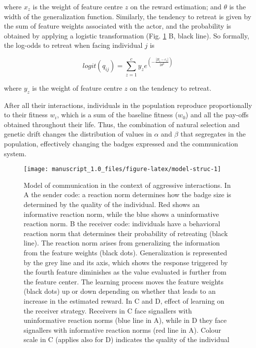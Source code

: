 \documentclass[
  12pt,
]{article}
\begin{document}
where \(x_z\) is the weight of feature centre \(z\) on the reward
estimation; and \(\theta\) is the width of the generalization function.
Similarly, the tendency to retreat is given by the sum of feature
weights associated with the actor, and the probability is obtained by
applying a logistic transformation (Fig. \ref{fig:model-struc} B, black
line). So formally, the log-odds to retreat when facing individual \(j\)
is

\begin{equation}
logit(q_{ij}) =  \sum_{z=1}^{c} y_z e^{(-\frac{|B_i-c_z|}{2\theta^2})} 
\end{equation}

where \(y_z\) is the weight of feature centre \(z\) on the tendency to
retreat.

After all their interactions, individuals in the population reproduce
proportionally to their fitness \(w_i\), which is a sum of the baseline
fitness (\(w_0\)) and all the pay-offs obtained throughout their life.
Thus, the combination of natural selection and genetic drift changes the
distribution of values in \(\alpha\) and \(\beta\) that segregates in
the population, effectively changing the badges expressed and the
communication system.

\begin{figure}

{\centering \texttt{[image: manuscript\_1.0\_files/figure-latex/model-struc-1]} 

}

\caption{Model of communication in the context of aggressive interactions. In A the sender code: a reaction norm determines how the badge size is determined by the quality of the individual. Red shows an informative reaction norm, while the blue shows a uninformative reaction norm. B the receiver code: individuals have a behavioral reaction norm that determines their probability of retreating (black line). The reaction norm arises from generalizing the information from the feature weights (black dots). Generalization is represented by the grey line and its axis, which shows the response triggered by the fourth feature diminishes as the value evaluated is further from the feature center. The learning process moves the feature weights (black dots) up or down depending on whether that leads to an increase in the estimated reward. In C and D, effect of learning on the receiver strategy. Receivers in C face signallers with uninformative reaction norms (blue line in A), while in D they face signallers with informative reaction norms (red line in A). Colour scale in C (applies also for D) indicates the quality of the individual}\label{fig:model-struc}
\end{figure}
\end{document}
